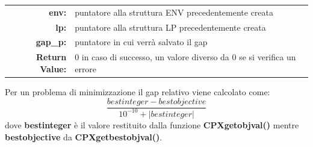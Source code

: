 \begin{itemize}
{\begin{table}[h]
\begin{tabular}{rl}
\textbf{env:} & {puntatore alla struttura ENV precedentemente creata}\\
\textbf{lp:} & {puntatore alla struttura LP precedentemente creata}\\
\textbf{gap\_p:} & {puntatore in cui verrà salvato il gap}\\
\textbf{Return Value:} & {0 in caso di successo, un valore diverso da 0 se si verifica un errore}\\
\end{tabular}
\end{table}
Per un problema di minimizzazione il gap relativo viene calcolato come:
$$\frac{bestinteger - bestobjective}{10^{-10}+|bestinteger|}$$
dove \textbf{bestinteger} è il valore restituito dalla funzione \textbf{CPXgetobjval()} mentre               \textbf{bestobjective} da \textbf{CPXgetbestobjval()}.
}
\end{itemize}

